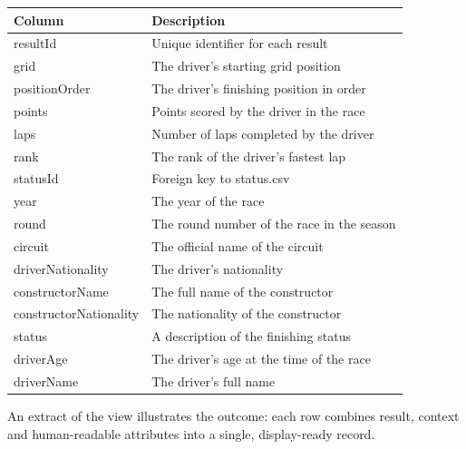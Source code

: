 \documentclass[
]{article}
\begin{document}
\begin{table}[!h]
\centering\begingroup\fontsize{9}{11}\selectfont

\begin{tabular}[t]{>{\raggedright\arraybackslash}p{4.5cm}>{\raggedright\arraybackslash}p{10cm}}
\toprule
Column & Description\\
\midrule
resultId & Unique identifier for each result\\
grid & The driver's starting grid position\\
positionOrder & The driver's finishing position in order\\
points & Points scored by the driver in the race\\
laps & Number of laps completed by the driver\\
rank & The rank of the driver's fastest lap\\
statusId & Foreign key to status.csv\\
year & The year of the race\\
round & The round number of the race in the season\\
circuit & The official name of the circuit\\
driverNationality & The driver's nationality\\
constructorName & The full name of the constructor\\
constructorNationality & The nationality of the constructor\\
status & A description of the finishing status\\
driverAge & The driver's age at the time of the race\\
driverName & The driver's full name\\
\bottomrule
\end{tabular}
\endgroup{}
\end{table}

An extract of the view illustrates the outcome: each row combines
result, context and human-readable attributes into a single,
display-ready record.
\end{document}
